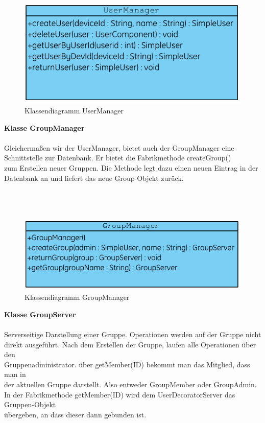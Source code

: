 \begin{figure}[h]
     \centering
     \includegraphics[scale=1.0, trim=1 1 1 1,clip=true]{servergraphs/user-manager.pdf}
     \caption{Klassendiagramm UserManager}
\end{figure}
\clearpage

\textbf{Klasse GroupManager}\\
\\
Gleichermaßen wir der UserManager, bietet auch der GroupManager eine \\
Schnittstelle zur Datenbank. Er bietet die Fabrikmethode createGroup()\\
zum Erstellen neuer Gruppen. Die Methode legt dazu einen neuen Eintrag in der\\
Datenbank an und liefert das neue Group-Objekt zurück.\\

\\ \\ \\
\begin{figure}[h]
     \centering
     \includegraphics[scale=1.0, trim=2 2 2 2, clip=true]{servergraphs/group-manager.pdf}
     \caption{Klassendiagramm GroupManager}
\end{figure}
\clearpage

\textbf{Klasse GroupServer}\\
\\
Serverseitige Darstellung einer Gruppe. Operationen werden auf der Gruppe nicht\\
direkt ausgeführt. Nach dem Erstellen der Gruppe, laufen alle Operationen über den\\
Gruppenadministrator. über getMember(ID) bekommt man das Mitglied, dass man in \\
der aktuellen Gruppe darstellt. Also entweder GroupMember oder GroupAdmin.
In der Fabrikmethode getMember(ID) wird dem UserDecoratorServer das Gruppen-Objekt\\
übergeben, an dass dieser dann gebunden ist.\\

